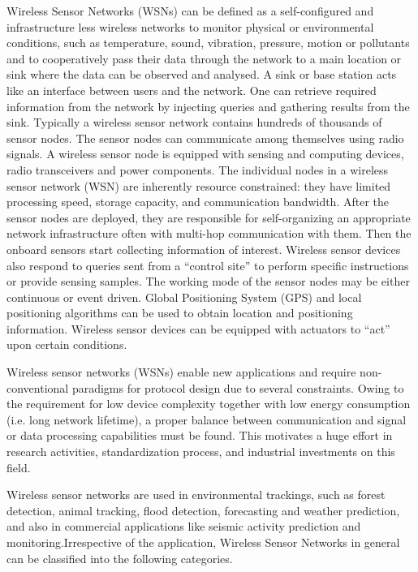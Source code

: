 Wireless Sensor Networks (WSNs) can be defined as a self-configured and infrastructure less wireless networks to monitor physical or environmental conditions, such as temperature, sound, vibration, pressure, motion or pollutants and to cooperatively pass their data through the network to a main location or sink where the data can be observed and analysed. A sink or base station acts like an interface between users and the network. One can retrieve required information from the network by injecting queries and gathering results from the sink. Typically a wireless sensor network contains hundreds of thousands of sensor nodes. The sensor nodes can communicate among themselves using radio signals. A wireless sensor node is equipped with sensing and computing devices, radio transceivers and power components. The individual nodes in a wireless sensor network (WSN) are inherently resource constrained: they have limited processing speed, storage capacity, and communication bandwidth. After the sensor nodes are deployed, they are responsible for self-organizing an appropriate network infrastructure often with multi-hop communication with them. Then the onboard sensors start collecting information of interest. Wireless sensor devices also respond to queries sent from a “control site” to perform specific instructions or provide sensing samples. The working mode of the sensor nodes may be either continuous or event driven. Global Positioning System (GPS) and local positioning algorithms can be used to obtain location and positioning information\cite{5}. Wireless sensor devices can be equipped with actuators to “act” upon certain conditions.


Wireless sensor networks (WSNs) enable new applications and require non-conventional paradigms for protocol design due to several constraints. Owing to the requirement for low device complexity together with low energy consumption (i.e. long network lifetime), a proper balance between communication and signal or data processing capabilities must be found. This motivates a huge effort in research activities, standardization process, and industrial investments on this field.


Wireless sensor networks are used in environmental trackings, such as forest detection\cite{6}, animal tracking\cite{7}, flood detection\cite{8}, forecasting and weather prediction\cite{9}, and also in commercial applications like seismic activity prediction and monitoring.Irrespective of the application, Wireless Sensor Networks in general can be classified into the following categories\cite{10}.

